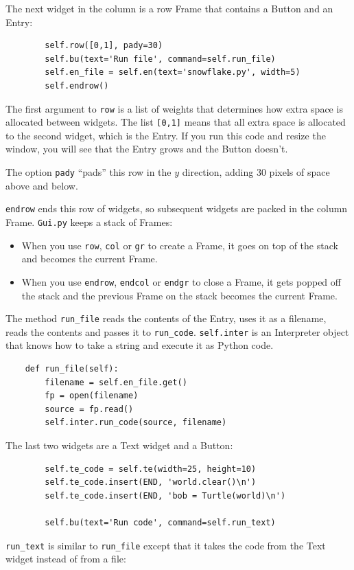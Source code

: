 \documentclass[10pt]{book}
\begin{document}
The next widget in the column is a row Frame that contains
a Button and an Entry:

\begin{verbatim}
        self.row([0,1], pady=30)
        self.bu(text='Run file', command=self.run_file)
        self.en_file = self.en(text='snowflake.py', width=5)
        self.endrow()
\end{verbatim}
%
The first argument to {\tt row} is a list of weights that
determines how extra space is allocated between widgets.  
The list {\tt [0,1]} means that all extra space is allocated
to the second widget, which is the Entry.  If you run this code
and resize the window, you will see that the Entry grows and
the Button doesn't.

The option {\tt pady} ``pads'' this row in the $y$ direction,
adding 30 pixels of space above and below.

{\tt endrow} ends this row of widgets, so subsequent widgets are
packed in the column Frame.  {\tt Gui.py} keeps a stack of Frames:

\begin{itemize}

\item When you use {\tt row}, {\tt col} or {\tt gr} to create a Frame,
it goes on top of the stack and becomes the current Frame.

\item When you use {\tt endrow}, {\tt endcol} or {\tt endgr} to close
a Frame, it gets popped off the stack and the previous Frame on the
stack becomes the current Frame.

\end{itemize} 

The method \verb"run_file" reads the contents of the Entry,
uses it as a filename, reads the contents
and passes it to \verb"run_code".  {\tt self.inter} is an
Interpreter object that knows how to take a string and
execute it as Python code.

\begin{verbatim}
    def run_file(self):
        filename = self.en_file.get()
        fp = open(filename)
        source = fp.read()
        self.inter.run_code(source, filename)
\end{verbatim}
%
The last two widgets are a Text widget and a Button:

\begin{verbatim}
        self.te_code = self.te(width=25, height=10)
        self.te_code.insert(END, 'world.clear()\n')
        self.te_code.insert(END, 'bob = Turtle(world)\n')

        self.bu(text='Run code', command=self.run_text)
\end{verbatim}
%
\verb"run_text" is similar to \verb"run_file" except that it takes
the code from the Text widget instead of from a file:
\end{document}
